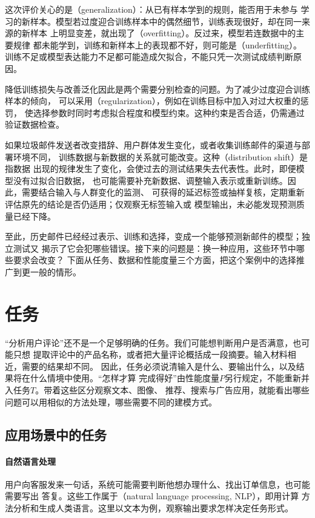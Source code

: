 这次评价关心的是（generalization）：从已有样本学到的规则，能否用于未参与
学习的新样本。模型若过度迎合训练样本中的偶然细节，训练表现很好，却在同一来源的新样本
上明显变差，就出现了（overfitting）。反过来，模型若连数据中的主要规律
都未能学到，训练和新样本上的表现都不好，则可能是（underfitting）。
训练不足或模型表达能力不足都可能造成欠拟合，不能只凭一次测试成绩判断原因。

降低训练损失与改善泛化因此是两个需要分别检查的问题。为了减少过度迎合训练样本的倾向，
可以采用（regularization），例如在训练目标中加入对过大权重的惩罚，
使选择参数时同时考虑拟合程度和模型约束。这种约束是否合适，仍需通过验证数据检查。

如果垃圾邮件发送者改变措辞、用户群体发生变化，或者收集训练邮件的渠道与部署环境不同，
训练数据与新数据的关系就可能改变。这种（distribution shift）是指数据
出现的规律发生了变化，会使过去的测试结果失去代表性。此时，即便模型没有过拟合旧数据，
也可能需要补充新数据、调整输入表示或重新训练。因此，需要结合输入与人群变化的监测、
可获得的延迟标签或抽样复核，定期重新评估原先的结论是否仍适用；仅观察无标签输入或
模型输出，未必能发现预测质量已经下降。

至此，历史邮件已经经过表示、训练和选择，变成一个能够预测新邮件的模型；独立测试又
揭示了它会犯哪些错误。接下来的问题是：换一种应用，这些环节中哪些要求会改变？
下面从任务、数据和性能度量三个方面，把这个案例中的选择推广到更一般的情形。

\section{任务}
\label{sec:machine-learning-tasks}

“分析用户评论”还不是一个足够明确的任务。我们可能想判断用户是否满意，也可能只想
提取评论中的产品名称，或者把大量评论概括成一段摘要。输入材料相近，需要的结果却不同。
因此，任务必须说清输入是什么、要输出什么，以及结果将在什么情境中使用。“怎样才算
完成得好”由性能度量$P$另行规定，不能重新并入任务$T$。带着这些区分观察文本、图像、
推荐、搜索与广告应用，就能看出哪些问题可以用相似的方法处理，哪些需要不同的建模方式。

\subsection{应用场景中的任务}

\paragraph{自然语言处理}
用户向客服发来一句话，系统可能需要判断他想办理什么、找出订单信息，也可能需要写出
答复。这些工作属于（natural language processing, NLP），即用计算
方法分析和生成人类语言。这里以文本为例，观察输出要求怎样决定任务形式。


